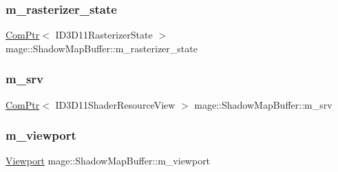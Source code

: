 \hypertarget{structmage_1_1_shadow_map_buffer_a46cf9e88e20431629f6622e3647fd58b}{}\label{structmage_1_1_shadow_map_buffer_a46cf9e88e20431629f6622e3647fd58b} 
\subsubsection{\texorpdfstring{m\+\_\+rasterizer\+\_\+state}{m\_rasterizer\_state}}
{\footnotesize\ttfamily \hyperlink{namespacemage_ae74f374780900893caa5555d1031fd79}{Com\+Ptr}$<$ I\+D3\+D11\+Rasterizer\+State $>$ mage\+::\+Shadow\+Map\+Buffer\+::m\+\_\+rasterizer\+\_\+state\hspace{0.3cm}{\ttfamily [private]}}

\hypertarget{structmage_1_1_shadow_map_buffer_af313b37ddc41f91e949d015086f6ba18}{}\label{structmage_1_1_shadow_map_buffer_af313b37ddc41f91e949d015086f6ba18} 
\subsubsection{\texorpdfstring{m\+\_\+srv}{m\_srv}}
{\footnotesize\ttfamily \hyperlink{namespacemage_ae74f374780900893caa5555d1031fd79}{Com\+Ptr}$<$ I\+D3\+D11\+Shader\+Resource\+View $>$ mage\+::\+Shadow\+Map\+Buffer\+::m\+\_\+srv\hspace{0.3cm}{\ttfamily [private]}}

\hypertarget{structmage_1_1_shadow_map_buffer_a5dd4126af774f674f69280f53dd8393d}{}\label{structmage_1_1_shadow_map_buffer_a5dd4126af774f674f69280f53dd8393d} 
\subsubsection{\texorpdfstring{m\+\_\+viewport}{m\_viewport}}
{\footnotesize\ttfamily \hyperlink{classmage_1_1_viewport}{Viewport} mage\+::\+Shadow\+Map\+Buffer\+::m\+\_\+viewport\hspace{0.3cm}{\ttfamily [private]}}

